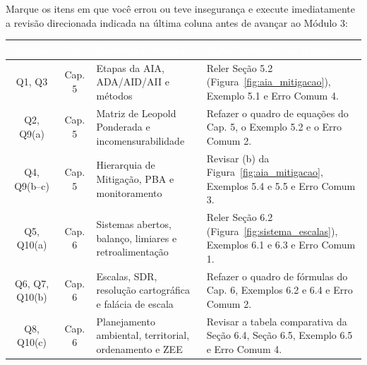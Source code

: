 Marque os itens em que você errou ou teve insegurança e execute imediatamente a revisão direcionada indicada na última coluna antes de avançar ao Módulo 3:

\begin{center}
\renewcommand{\arraystretch}{1.22}
\small
\begin{tabularx}{\textwidth}{@{}c c p{4.2cm} >{\raggedright\arraybackslash}X@{}}
  \toprule
  \rowcolor{uefsNavy}
  \textcolor{white}{\bfseries Questão} & \textcolor{white}{\bfseries Cap.} & \textcolor{white}{\bfseries Conteúdo Avaliado} & \textcolor{white}{\bfseries Ação Corretiva de Revisão} \\
  \midrule
  Q1, Q3 & Cap. 5 & Etapas da AIA, ADA/AID/AII e métodos & Reler Seção 5.2 (Figura~\ref{fig:aia_mitigacao}), Exemplo 5.1 e Erro Comum 4. \\
  \rowcolor{bgGray}
  Q2, Q9(a) & Cap. 5 & Matriz de Leopold Ponderada e incomensurabilidade & Refazer o quadro de equações do Cap. 5, o Exemplo 5.2 e o Erro Comum 2. \\
  Q4, Q9(b--c) & Cap. 5 & Hierarquia de Mitigação, PBA e monitoramento & Revisar (b) da Figura~\ref{fig:aia_mitigacao}, Exemplos 5.4 e 5.5 e Erro Comum 3. \\
  \rowcolor{bgGray}
  Q5, Q10(a) & Cap. 6 & Sistemas abertos, balanço, limiares e retroalimentação & Reler Seção 6.2 (Figura~\ref{fig:sistema_escalas}), Exemplos 6.1 e 6.3 e Erro Comum 1. \\
  Q6, Q7, Q10(b) & Cap. 6 & Escalas, SDR, resolução cartográfica e falácia de escala & Refazer o quadro de fórmulas do Cap. 6, Exemplos 6.2 e 6.4 e Erro Comum 2. \\
  \rowcolor{bgGray}
  Q8, Q10(c) & Cap. 6 & Planejamento ambiental, territorial, ordenamento e ZEE & Revisar a tabela comparativa da Seção 6.4, Seção 6.5, Exemplo 6.5 e Erro Comum 4. \\
  \bottomrule
\end{tabularx}
\end{center}
